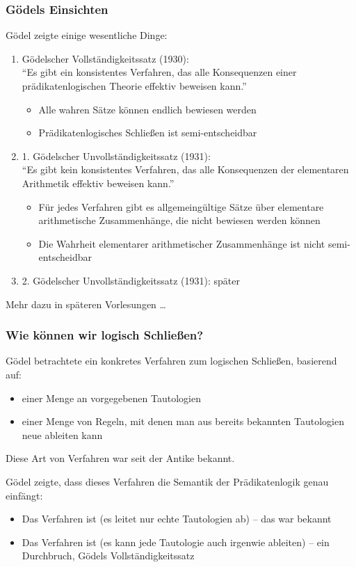 \documentclass[onlymath]{beamer}
\begin{document}
\begin{frame}\frametitle{Gödels Einsichten}

Gödel zeigte einige wesentliche Dinge:
\begin{enumerate}[(1)]
\item \alert{Gödelscher Vollständigkeitssatz (1930):}\\
"`Es gibt ein konsistentes Verfahren, das alle Konsequenzen einer prädikatenlogischen Theorie
effektiv beweisen kann."'
\begin{itemize}
\item Alle wahren Sätze können endlich bewiesen werden
\item Prädikatenlogisches Schließen ist semi-entscheidbar
\end{itemize}\pause
%
\item \alert{1. Gödelscher Unvollständigkeitssatz (1931):} \\
"`Es gibt kein konsistentes Verfahren, das alle Konsequenzen der elementaren Arithmetik
effektiv beweisen kann."'
\begin{itemize}
\item Für jedes Verfahren gibt es allgemeingültige Sätze über elementare arithmetische Zusammenhänge, die nicht bewiesen werden können
\item Die Wahrheit elementarer arithmetischer Zusammenhänge ist nicht semi-entscheidbar
\end{itemize}\pause
\item \alert{2. Gödelscher Unvollständigkeitssatz (1931):} später
\end{enumerate}

Mehr dazu in späteren Vorlesungen \ldots

\end{frame}


\begin{frame}\frametitle{Wie können wir logisch Schließen?}

Gödel betrachtete ein konkretes Verfahren zum logischen Schließen,
basierend auf:
\begin{itemize}
\item einer Menge an vorgegebenen Tautologien
\item einer Menge von Regeln, mit denen man aus bereits bekannten Tautologien
neue ableiten kann
\end{itemize}
\alert{Diese Art von Verfahren war seit der Antike bekannt.}
\bigskip\pause

Gödel zeigte, dass dieses Verfahren die Semantik der Prädikatenlogik genau
einfängt:
\begin{itemize}
\item Das Verfahren ist  (es leitet nur echte Tautologien ab) -- das war bekannt
\item Das Verfahren ist  (es kann jede Tautologie auch irgenwie ableiten) -- ein Durchbruch, Gödels Vollständigkeitssatz
\end{itemize}

\end{frame}
\end{document}

